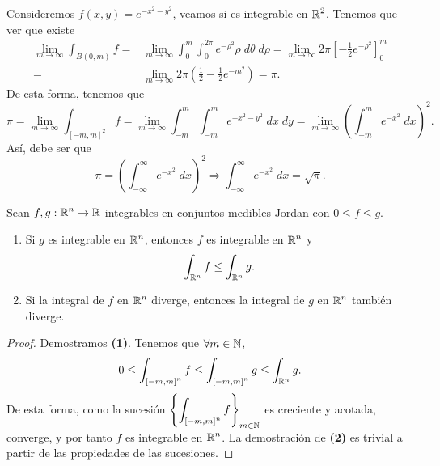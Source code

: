 \begin{eg}
Consideremos $\displaystyle f\left(x,y\right)=e^{-x^{2}-y^{2}} $, veamos si es integrable en $\displaystyle \mathbb{R}^{2} $. Tenemos que ver que existe
\[
\begin{split}
	\lim_{m \to \infty}\int _{B\left(0,m\right)} f = & \lim_{m \to \infty}\int^{m}_{0} \int^{2\pi }_{0} e^{-\rho^{2}}\rho \; d\theta \; d\rho =\lim_{m \to \infty}2\pi \left[-\frac{1}{2}e^{-\rho^{2}}\right] ^{m}_{0} \\
	= & \lim_{m \to \infty}2\pi\left(\frac{1}{2}-\frac{1}{2}e^{-m^{2}}\right)=\pi .
\end{split}
\]
De esta forma, tenemos que 
\[\pi = \lim_{m \to \infty}\int _{\left[-m, m\right] ^{2}}f =\lim_{m \to \infty}\int^{m}_{-m} \int^{m}_{-m} e^{-x^{2}-y^{2}} \; dx \; dy=\lim_{m \to \infty}\left(\int^{m}_{-m} e^{-x^{2}} \; dx \right)^{2} .\]
Así, debe ser que 
\[\pi = \left(\int^{\infty}_{-\infty} e^{-x^{2}} \; dx\right)^{2} \Rightarrow \int^{\infty}_{-\infty} e^{-x^{2}} \; dx = \sqrt{\pi } .\]
\end{eg}
\begin{prop}
Sean $\displaystyle f, g : \mathbb{R}^{n} \to \mathbb{R} $ integrables en conjuntos medibles Jordan con $\displaystyle 0 \leq f \leq g $. 
\begin{enumerate}
\item Si $\displaystyle g $ es integrable en $\displaystyle \mathbb{R}^{n} $, entonces $\displaystyle f $ es integrable en $\displaystyle \mathbb{R}^{n} $ y 
\[\int _{\mathbb{R}^{n}}f \leq \int _{\mathbb{R}^{n}}g  .\]
\item Si la integral de $\displaystyle f $ en $\displaystyle \mathbb{R}^{n} $ diverge, entonces la integral de $\displaystyle g $ en $\displaystyle \mathbb{R}^{n} $ también diverge.
\end{enumerate}
\end{prop}
\begin{proof}
Demostramos \textbf{(1)}. Tenemos que $\displaystyle \forall m \in \mathbb{N} $,
\[0 \leq \int _{\left[-m,m\right] ^{n}}f \leq \int _{\left[-m,m\right] ^{n}}g \leq \int _{\mathbb{R}^{n}}g   .\]
De esta forma, como la sucesión $\displaystyle \left\{ \int _{\left[-m,m\right] ^{n}}f \right\} _{m\in\mathbb{N}} $ es creciente y acotada, converge, y por tanto $\displaystyle f $ es integrable en $\displaystyle \mathbb{R}^{n} $. La demostración de \textbf{(2)} es trivial a partir de las propiedades de las sucesiones.
\end{proof}

